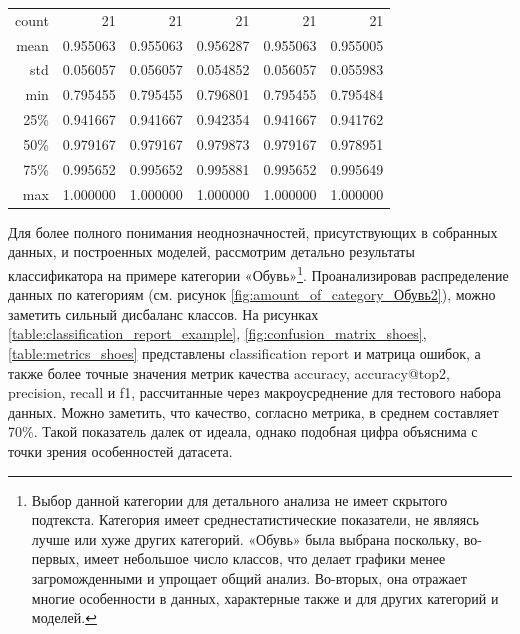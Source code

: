 \documentclass[a4paper,12pt]{extarticle}
\begin{document}
\begin{table}[ht]
\begin{tabular}{r|rrrrr}
		count &	21 & 21 & 21 & 21 & 21\\
		mean  & 0.955063 & 0.955063 & 0.956287 & 0.955063 & 0.955005\\
		std   & 0.056057 & 0.056057 & 0.054852 & 0.056057 & 0.055983\\
		min   & 0.795455 & 0.795455 & 0.796801 & 0.795455 & 0.795484\\
		25\%  &	0.941667 & 0.941667 & 0.942354 & 0.941667 & 0.941762\\
		50\%  &	0.979167 & 0.979167 & 0.979873 & 0.979167 & 0.978951\\
		75\%  &	0.995652 & 0.995652 & 0.995881 & 0.995652 & 0.995649\\
		max   &	1.000000 & 1.000000 & 1.000000 & 1.000000 & 1.000000\\
		\bottomrule
	\end{tabular}
\end{table}

Для более полного понимания неоднозначностей, присутствующих в собранных данных, и построенных моделей, рассмотрим детально результаты классификатора на примере категории «Обувь»\footnote{Выбор данной категории для детального анализа не имеет скрытого подтекста. Категория имеет среднестатистические показатели, не являясь лучше или хуже других категорий. «Обувь» была выбрана поскольку, во-первых, имеет небольшое число классов, что делает графики менее загроможденными и упрощает общий анализ. Во-вторых, она отражает многие особенности в данных, характерные также и для других категорий и моделей.}. Проанализировав распределение данных по категориям (см. рисунок \ref{fig:amount_of_category_Обувь2}), можно заметить сильный дисбаланс классов. На рисунках \ref{table:classification_report_example}, \ref{fig:confusion_matrix_shoes}, \ref{table:metrics_shoes} представлены classification report и матрица ошибок, а также более точные значения метрик качества accuracy, accuracy@top2, precision, recall и f1, рассчитанные через макроусреднение для тестового набора данных. Можно заметить, что качество, согласно метрика, в среднем составляет 70\%. Такой показатель далек от идеала, однако подобная цифра объяснима с точки зрения особенностей датасета. 
\end{document}
